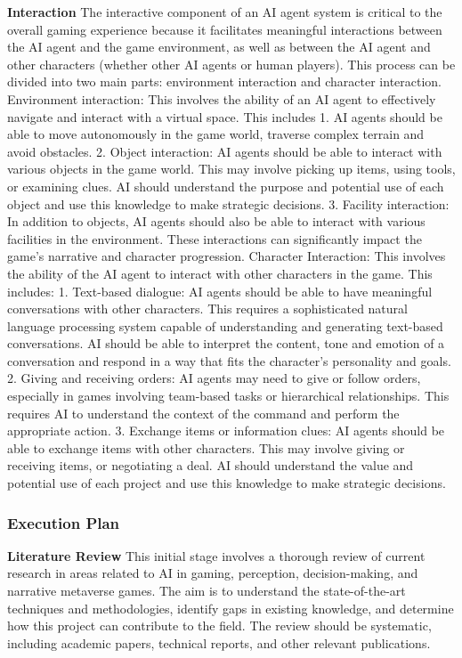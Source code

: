 \textbf{Interaction}\quad
The interactive component of an AI agent system is critical to the overall gaming experience because it facilitates meaningful interactions between the AI agent and the game environment, 
as well as between the AI agent and other characters (whether other AI agents or human players). 
This process can be divided into two main parts: environment interaction and character interaction. 
Environment interaction: This involves the ability of an AI agent to effectively navigate and interact with a virtual space. 
This includes 1. AI agents should be able to move autonomously in the game world, traverse complex terrain and avoid obstacles. 
2. Object interaction: AI agents should be able to interact with various objects in the game world. 
This may involve picking up items, using tools, or examining clues. AI should understand the purpose and potential use of each object and use this knowledge to make strategic decisions. 
3. Facility interaction: In addition to objects, AI agents should also be able to interact with various facilities in the environment. 
These interactions can significantly impact the game's narrative and character progression. 
Character Interaction: This involves the ability of the AI agent to interact with other characters in the game. 
This includes: 1. Text-based dialogue: AI agents should be able to have meaningful conversations with other characters. 
This requires a sophisticated natural language processing system capable of understanding and generating text-based conversations. 
AI should be able to interpret the content, tone and emotion of a conversation and respond in a way that fits the character's personality and goals. 
2. Giving and receiving orders: AI agents may need to give or follow orders, especially in games involving team-based tasks or hierarchical relationships. 
This requires AI to understand the context of the command and perform the appropriate action. 
3. Exchange items or information clues: AI agents should be able to exchange items with other characters. This may involve giving or receiving items, or negotiating a deal. 
AI should understand the value and potential use of each project and use this knowledge to make strategic decisions.


\subsubsection{Execution Plan}

\textbf{Literature Review}\quad
This initial stage involves a thorough review of current research in areas related to AI in gaming, perception, decision-making, and narrative metaverse games. The aim is to understand the state-of-the-art techniques and methodologies, identify gaps in existing knowledge, and determine how this project can contribute to the field. The review should be systematic, including academic papers, technical reports, and other relevant publications.

